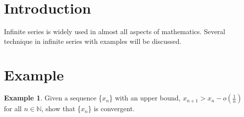 \documentclass[12pt]{article}
\numberwithin{equation}{section}
\theoremstyle{plain} %
\theoremstyle{definition}
\newtheorem{example}[equation]{Example}
\theoremstyle{remark}
\begin{document}

\section{Introduction}
Infinite series is widely used in almost all aspects of mathematics. Several technique in infinite series with examples will be discussed.  

\section{Example}

\begin{example}
Given a sequence \{$x_n$\} with an upper bound, $x_{n+1} > x_{n} - o(\frac{1}{n})$ for all $n \in \mathbb{N}$, show that \{$x_n$\} is convergent. 
\end{example}
\end{document}
